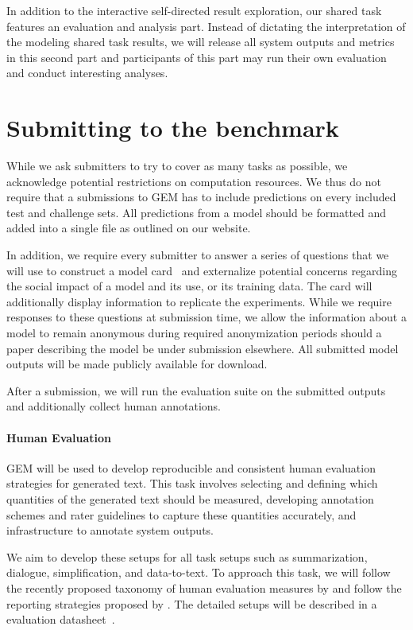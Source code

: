 \documentclass[11pt,a4paper]{article}
\newcommand{\GEM}{\textsc{GEM}}
\begin{document}
In addition to the interactive self-directed result exploration, our shared task features an evaluation and analysis part. Instead of dictating the interpretation of the modeling shared task results, we will release all system outputs and metrics in this second part and participants of this part may run their own evaluation and conduct interesting analyses. 





\section{Submitting to the benchmark}

While we ask submitters to try to cover as many tasks as possible, we acknowledge potential restrictions on computation resources. We thus do not require that a submissions to \GEM{} has to include predictions on every included test and challenge sets. 
All predictions from a model should be formatted and added into a single file as outlined on our website. 

In addition, we require every submitter to answer a series of questions that we will use to construct a model card~\citep{mitchell2019model} and externalize potential concerns regarding the social impact of a model and its use, or its training data. The card will additionally display information to replicate the experiments. 
While we require responses to these questions at submission time, we allow the information about a model to remain anonymous during required anonymization periods should a paper describing the model be under submission elsewhere. 
All submitted model outputs will be made publicly available for download.  

After a submission, we will run the evaluation suite on the submitted outputs and additionally collect human annotations.

\paragraph{Human Evaluation} \GEM{} will be used to develop reproducible and consistent human evaluation strategies for generated text. This task involves selecting and defining which quantities of the generated text should be measured, developing annotation schemes and rater guidelines to capture these quantities accurately, and infrastructure to annotate system outputs.

We aim to develop these setups for all task setups such as summarization, dialogue, simplification, and data-to-text. To approach this task, we will follow the recently proposed taxonomy of human evaluation measures by \citet{belz2020disentangling} and follow the reporting strategies proposed by \citet{howcroft2020twenty}. The detailed setups will be described in a evaluation datasheet~\citep{shimorina2021human}.  
\end{document}
